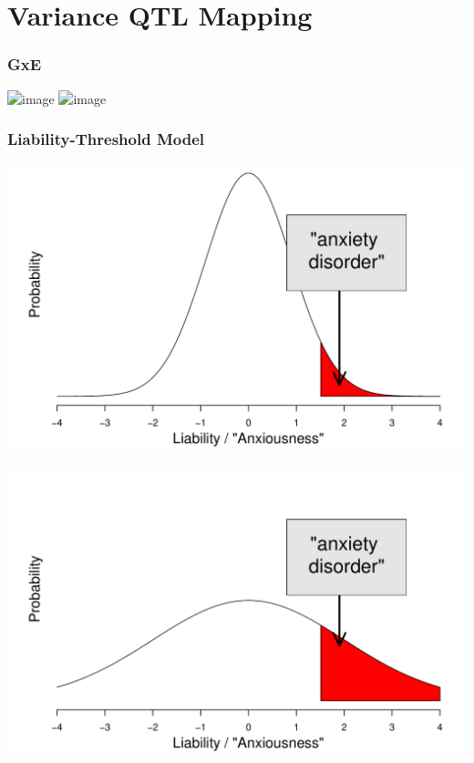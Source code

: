 \documentclass{beamer}
\begin{document}
\section{Variance QTL Mapping}

\begin{frame}\frametitle{GxE}
    \begin{center}
        \includegraphics<1>[width = 0.5\textwidth]{vQTL_unexplained}
        \includegraphics<2>[width = 0.5\textwidth]{vQTL_explained}
    \end{center}
\end{frame}

\begin{frame}\frametitle{Liability-Threshold Model}

    \begin{minipage}{0.45\textwidth}
        \begin{center}
            \includegraphics[width = \textwidth]{liability_threshold_low}
        \end{center}
    \end{minipage}\hfill
    \begin{minipage}{0.45\textwidth}
        \begin{center}
            \includegraphics[width = \textwidth]{liability_threshold_high}
        \end{center}
    \end{minipage}
    
\end{frame}
\end{document}
